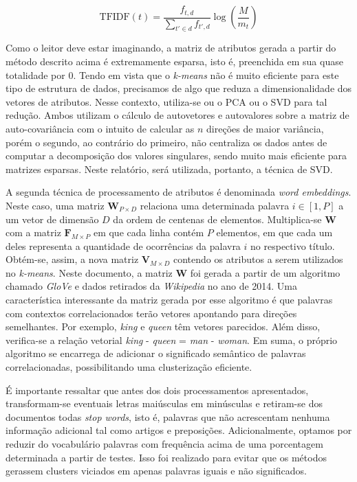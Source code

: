 \documentclass[10pt,twocolumn,letterpaper]{article}
\begin{document}
\begin{equation}
\label {eq:tfidf}
\text{TFIDF} (t) = \frac{f_{t,d}}{\displaystyle\sum_{t' \in d} f_{t',d}}\log\left(\frac{M}{m_t}\right)
\end{equation}

Como o leitor deve estar imaginando, a matriz de atributos gerada a partir do método descrito acima é extremamente esparsa, isto é, preenchida em sua quase totalidade por 0. Tendo em vista que o \textit{k-means} não é muito eficiente para este tipo de estrutura de dados, precisamos de algo que reduza a dimensionalidade dos vetores de atributos. Nesse contexto, utiliza-se ou o PCA ou o SVD para tal redução. Ambos utilizam o cálculo de autovetores e autovalores sobre a matriz de auto-covariância com o intuito de calcular as \(n\) direções de maior variância, porém o segundo, ao contrário do primeiro, não centraliza os dados antes de computar a decomposição dos valores singulares, sendo muito mais eficiente para matrizes esparsas. Neste relatório, será utilizada, portanto, a técnica de SVD.

A segunda técnica de processamento de atributos é denominada \textit{word embeddings}. Neste caso, uma matriz \(\bm{W}_{P \times D}\) relaciona uma determinada palavra \(i \in [1, P]\) a um vetor de dimensão \(D\) da ordem de centenas de elementos. Multiplica-se \(\bm{W}\) com a matriz \(\bm{F}_{M \times P}\) em que cada linha contém \(P\) elementos, em que cada um deles representa a quantidade de ocorrências da palavra \(i\) no respectivo título. Obtém-se, assim, a nova matriz \(\bm{V}_{M \times D}\) contendo os atributos a serem utilizados no \textit{k-means}. Neste documento, a matriz \(\bm{W}\) foi gerada a partir de um algoritmo chamado \textit{GloVe} \cite{pennington2014glove} e dados retirados da \textit{Wikipedia} no ano de 2014. Uma característica interessante da matriz gerada por esse algoritmo é que palavras com contextos correlacionados terão vetores apontando para direções semelhantes. Por exemplo, \textit{king} e \textit{queen} têm vetores parecidos. Além disso, verifica-se a relação vetorial \textit{king} - \textit{queen} = \textit{man} - \textit{woman}. Em suma, o próprio algoritmo se encarrega de adicionar o significado semântico de palavras correlacionadas, possibilitando uma clusterização eficiente.

É importante ressaltar que antes dos dois processamentos apresentados, transformam-se eventuais letras maiúsculas em minúsculas e retiram-se dos documentos todas \textit{stop words}, isto é, palavras que não acrescentam nenhuma informação adicional tal como artigos e preposições. Adicionalmente, optamos por reduzir do vocabulário palavras com frequência acima de uma porcentagem determinada a partir de testes. Isso foi realizado para evitar que os métodos gerassem clusters viciados em apenas palavras iguais e não significados.
\end{document}
